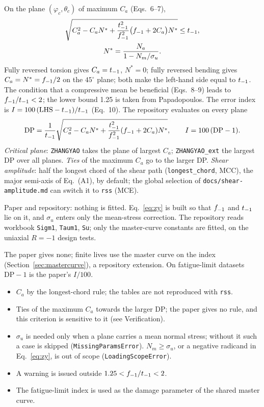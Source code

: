  On the plane $(\varphi_c,\theta_c)$ of maximum $C_a$ (Eqs.~6--7),
\begin{gather}
\sqrt{C_a^2 - C_a N^* + \frac{t_{-1}^2}{f_{-1}^2}\bigl(f_{-1} + 2C_a\bigr)N^*} \le t_{-1} ,
\label{eq:zy}\\
N^* = \frac{N_a}{1-N_m/\sigma_u} .
\label{eq:zy-nstar}
\end{gather}
Fully reversed torsion gives $C_a=t_{-1}$, $N^*=0$; fully reversed bending gives $C_a=N^*=f_{-1}/2$ on the
$45^\circ$ plane; both make the left-hand side equal to $t_{-1}$. The condition that a compressive mean be
beneficial (Eqs.~8--9) leads to $f_{-1}/t_{-1}<2$; the lower bound 1.25 is taken from Papadopoulos. The error
index is $I=100\,(\mathrm{LHS}-t_{-1})/t_{-1}$ (Eq.~10). The repository evaluates on every plane
\begin{equation}
\mathrm{DP} = \frac{1}{t_{-1}}\sqrt{C_a^2 - C_a N^* + \frac{t_{-1}^2}{f_{-1}^2}(f_{-1}+2C_a)N^*},
\qquad I = 100\,(\mathrm{DP}-1).
\label{eq:zy-dp}
\end{equation}
\emph{Critical plane}: \texttt{ZHANGYAO} takes the plane of largest $C_a$; \texttt{ZHANGYAO\_ext} the
largest DP over all planes. \emph{Ties} of the maximum $C_a$ go to the larger DP. \emph{Shear
amplitude}: half the longest chord of the shear path (\texttt{longest\_chord}, MCC), the major
semi-axis of Eq.~(A1), by default; the global selection of \texttt{docs/shear-amplitude.md} can switch
it to \texttt{rss} (MCE).

 Paper and repository: nothing is fitted. Eq.~\eqref{eq:zy} is built so
that $f_{-1}$ and $t_{-1}$ lie on it, and $\sigma_u$ enters only the mean-stress correction. The repository
reads workbook \texttt{Sigm1}, \texttt{Taum1}, \texttt{Su}; only the master-curve constants are fitted,
on the uniaxial $R=-1$ design tests.

 The paper gives none; finite lives use the master curve on the index
(Section~\ref{sec:mastercurve}), a repository extension. On fatigue-limit datasets $\mathrm{DP}-1$ is
the paper's $I/100$.

\begin{itemize}
\item $C_a$ by the longest-chord rule; the tables are not reproduced with \texttt{rss}.
\item Ties of the maximum $C_a$ towards the larger DP; the paper gives no rule, and this criterion is
  sensitive to it (see Verification).
\item $\sigma_u$ is needed only when a plane carries a mean normal stress; without it such a case is
  skipped (\texttt{MissingParamsError}). $N_m\ge\sigma_u$, or a negative radicand in
  Eq.~\eqref{eq:zy}, is out of scope (\texttt{LoadingScopeError}).
\item A warning is issued outside $1.25<f_{-1}/t_{-1}<2$.
\item The fatigue-limit index is used as the damage parameter of the shared master curve.
\end{itemize}

